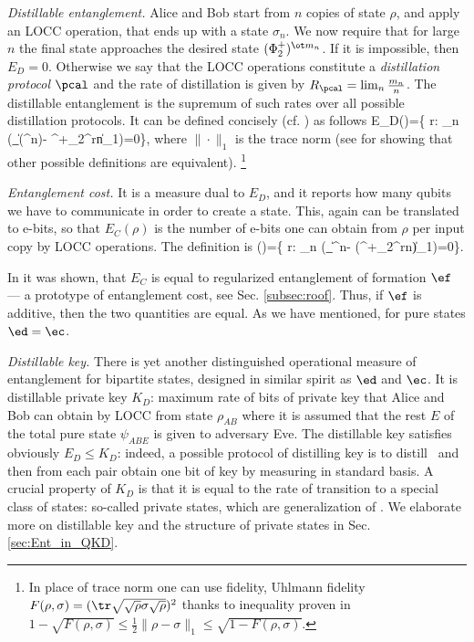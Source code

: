 \documentclass[rmp,12pt,preprint]{revtex4-2}
\begin{document}
{\it Distillable entanglement.} Alice and Bob start from $n$ copies
of state $\rho$, and apply an LOCC operation, that ends up with a
state $\sigma_n$. We now require that for large $n$ the final state
approaches the desired state $(\Phi^+_2)^{\ot m_n}$. If it is
impossible, then $E_D=0$.  Otherwise we say that the LOCC operations
constitute a {\it distillation protocol} $\pcal$ and the rate of
distillation is given by $R_\pcal=\lim_n {m_n\over n}$. The
distillable entanglement is the supremum of such rates over all
possible distillation protocols. It can be defined concisely  (cf.
\cite{PlenioVirmani2006-review}) as follows \be
E_D(\rho)=\sup\left\{ r: \lim_{n\to \infty} \left(\inf_\Lambda \|
\Lambda(\rho^{\ot n})- \Phi^+_{2^{rn}}\|_1\right)=0\right\}, \ee
where $\|\cdot\|_1$ is the trace norm (see \cite{Rains1998-def} for
showing that other possible definitions are equivalent).
\footnote{In place of trace norm one can use fidelity,
Uhlmann fidelity $F(\rho,\sigma)=(\tr \sqrt{\sqrt \rho \sigma\sqrt
\rho})^2$ thanks to inequality proven in \cite{Fuchs-Graaf} $
1-\sqrt{F(\rho,\sigma)} \leq \frac{1}{2} \|\rho-\sigma\|_1 \leq
\sqrt{1-F(\rho,\sigma)}.
  \label{eq:fuchs}$
}


{\it Entanglement cost.} It is a measure dual to $E_D$, and it
reports how many qubits we have to communicate in order to create a
state. This, again can be translated to e-bits, so that $E_C(\rho)$
is the number of e-bits one can obtain from $\rho$ per input copy by
LOCC operations. The definition is
\be \ec(\rho)=\inf\left\{ r:
\lim_{n\to \infty} \left(\inf_\Lambda \| \rho^{\ot n}-
\Lambda(\Phi^+_{2^{rn}})\|_1\right)=0\right\}.
\ee

In \cite{cost} it was shown, that $E_C$ is equal to regularized entanglement of formation
$\ef$ --- a prototype of entanglement cost, see Sec. \ref{subsec:roof}.
Thus, if $\ef$ is additive, then the two quantities are equal.
As we have mentioned, for pure states $\ed=\ec$.

{\it Distillable key.}
There is yet another distinguished operational measure
of entanglement for bipartite states, designed in similar spirit as $\ed$ and $\ec$.
It is distillable private key $K_D$: maximum rate of bits
of private key that Alice and Bob can obtain by LOCC from state $\rho_{AB}$
where it is assumed that the rest $E$ of the total pure state $\psi_{ABE}$
is given to adversary Eve.  The distillable key satisfies obviously
$E_D\leq K_D$: indeed, a possible protocol of distilling key
is to distill \eprstates\ and then from each pair obtain one bit of
key by measuring in standard basis. A crucial property of $K_D$
is that it is equal to the rate of transition to a special class of states:
so-called private states, which are generalization of \eprstates.
We elaborate more on distillable key and the structure of private states in Sec.
\ref{sec:Ent_in_QKD}.
\end{document}
